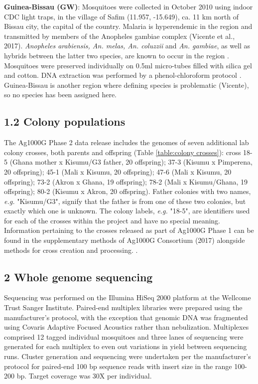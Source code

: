 \documentclass[a4paper,11pt,abstracton,hidelinks]{scrartcl}
\begin{document}
%
\textbf{Guinea-Bissau (GW)}: Mosquitoes were collected in October 2010 using indoor CDC light traps, in the village of Safim (11.957, -15.649), ca. 11 km north of Bissau city, the capital of the country.
%
Malaria is hyperendemic in the region and transmitted by members of the Anopheles gambiae complex (Vicente et al., 2017).
%
\textit{Anopheles arabiensis, An. melas, An. coluzzii} and \textit{An. gambiae}, as well as hybrids between the latter two species, are known to occur in the region \cite{Gordicho2014, Vicente2017}.
%
Mosquitoes were preserved individually on 0.5ml micro-tubes filled with silica gel and cotton. DNA extraction was performed by a phenol-chloroform protocol \cite{Donnelly1999}.
%
Guinea-Bissau is another region where defining species is problematic (Vicente), so no species has been assigned here.

\subsection*{1.2 Colony populations}

The Ag1000G Phase 2 data release includes the genomes of seven additional lab colony crosses, both parents and offspring (Table \ref{table:colony crosses}):
%
cross 18-5 (Ghana mother x Kisumu/G3 father, 20 offspring); 37-3 (Kisumu x Pimperena, 20 offspring); 45-1 (Mali x Kisumu, 20 offspring); 47-6 (Mali x Kisumu, 20 offspring); 73-2 (Akron x Ghana, 19 offspring); 78-2 (Mali x Kisumu/Ghana, 19 offspring); 80-2 (Kisumu x Akron, 20 offspring).
%
Father colonies with two names, \textit{e.g.} "Kisumu/G3", signify that the father is from one of these two colonies, but exactly which one is unknown.
%
The	colony labels, \textit{e.g.}	"18-5", are	identifiers used for	
each of the crosses	within the project and	have no special meaning.	
%
Information pertaining to the crosses released as part of Ag1000G Phase 1 can be found in the supplementary methods of Ag1000G Consortium (2017) alongside methods for cross creation and processing. \cite{Ag1000gConsortium2017}.

\subsection*{2 Whole genome sequencing}

%
Sequencing was performed on the Illumina HiSeq 2000 platform at the Wellcome Trust Sanger Institute.
%
Paired-end multiplex libraries were prepared using the manufacturer's protocol, with the exception that genomic DNA was fragmented using Covaris Adaptive Focused Acoustics rather than nebulization.
%
Multiplexes comprised 12 tagged individual mosquitoes and three lanes of sequencing were generated for each multiplex to even out variations in yield between sequencing runs.
%
Cluster generation and sequencing were undertaken per the manufacturer's protocol for paired-end 100 bp sequence reads with insert size in the range 100-200 bp.
%
Target coverage was 30X per individual.
\end{document}
